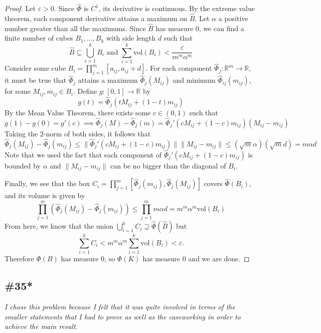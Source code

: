 \documentclass{article}
\newcommand{\vol}{\mathrm{vol}}
\theoremstyle{plain} %
\numberwithin{thm}{section} %
\theoremstyle{definition}
\begin{document}
\begin{proof}
            Let \(\varepsilon > 0\). Since \(\hat{\Phi}\) is \(C^1\), its derivative is continuous. By the extreme value theorem, each component derivative attains a maximum on \(\hat{B}\). Let \(\alpha\) a positive number greater than all the maximums. Since \(\hat{B}\) has measure 0, we can find a finite number of cubes \(B_1, ..., B_k\) with side length \(d\) such that
            \[
                \hat{B} \subseteq \bigcup_{i=1}^{k} B_i \text{ and } \sum_{i=1}^{k} \vol(B_i) < \frac{\varepsilon}{m^m \alpha^m}
            \]
            Consider some cube \(B_i = \prod_{j=1}^{m} [a_{ij}, a_{ij} + d]\). For each component \(\hat{\Phi}_j: \mathbb{R}^m \to \mathbb{R}\), it must be true that \(\hat{\Phi}_j\) attains a maximum \(\hat{\Phi}_j(M_{ij})\) and minimum \(\hat{\Phi}_{ij}(m_{ij})\), for some \(M_{ij}, m_{ij} \in B_i\). Define \(g: [0,1] \to \mathbb{R}\) by
            \[
                g(t) = \hat{\Phi}_j(t M_{ij} + (1 - t)m_{ij})
            \]
            By the Mean Value Theorem, there exists some \(c \in (0,1)\) such that
            \[
                g(1) - g(0) = g'(c) \implies \hat{\Phi}_j (M) - \hat{\Phi}_j (m) = \hat{\Phi}_j '(c M_{ij} + (1 - c)m_{ij})(M_{ij} - m_{ij})
            \]
            Taking the 2-norm of both sides, it follows that
            \[
                \hat{\Phi}_j (M_{ij}) - \hat{\Phi}_j (m_{ij}) \leq \|\hat{\Phi}_j '(c M_{ij} + (1 - c)m_{ij})\| \|M_{ij} - m_{ij}\| \leq (\sqrt{m} \alpha)(\sqrt{m}d) = m \alpha d
            \]
            Note that we used the fact that each component of \(\hat{\Phi}_j '(c M_{ij} + (1 - c)m_{ij})\) is bounded by \(\alpha\) and \(\|M_{ij} - m_{ij}\|\) can be no bigger than the diagonal of \(B_i\).

            Finally, we see that the box \(C_i = \prod_{j=1}^m [\hat{\Phi}_j(m_{ij}), \hat{\Phi}_j(M_{ij})]\) covers \(\hat{\Phi} (B_i)\), and its volume is given by
            \[
                \prod_{j=1}^m (\hat{\Phi}_j (M_{ij}) - \hat{\Phi}_j (m_{ij})) \leq \prod_{j=1}^m m \alpha d = m^m \alpha^m \vol (B_i)
            \]
            From here, we know that the union \(\bigcup_{i=1}^{k} C_i \supseteq \hat{\Phi}(\hat{B})\) but
            \[
                \sum_{i=1}^{k} C_i < m^m \alpha^m \sum_{i=1}^{k} \vol (B_i) < \varepsilon.
            \]
            Therefore \(\Phi(B)\) has measure 0, so \(\Phi (K)\) has measure 0 and we are done.
        \end{proof}
        \newpage
        \subsection{\#35*}
        \textit{I chose this problem because I felt that it was quite involved in terms of the smaller statements that I had to prove as well as the caseworking in order to achieve the main result.}
\end{document}
